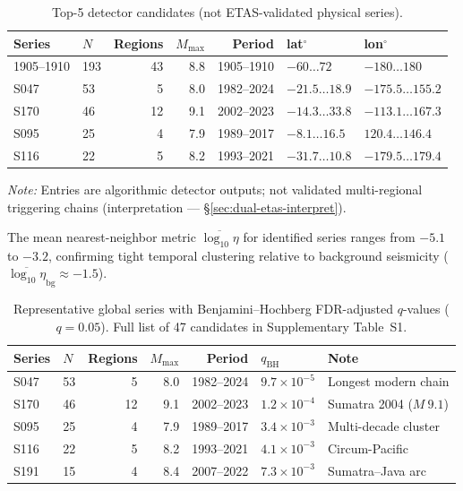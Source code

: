 \documentclass[draft]{agujournal2019}
\begin{document}
\begin{table}[htbp]
\centering
\caption{Top-5 detector candidates (not ETAS-validated physical series).}
\label{tab:top5}
\begin{tabular}{llrrrll}
\hline
Series & $N$ & Regions & $M_\mathrm{max}$ & Period & lat$^\circ$ & lon$^\circ$ \\
\hline
1905--1910 & 193 & 43 & 8.8 & 1905--1910 & $-60\ldots72$ & $-180\ldots180$ \\
S047       &  53 &  5 & 8.0 & 1982--2024 & $-21.5\ldots18.9$ & $-175.5\ldots155.2$ \\
S170       &  46 & 12 & 9.1 & 2002--2023 & $-14.3\ldots33.8$ & $-113.1\ldots167.3$ \\
S095       &  25 &  4 & 7.9 & 1989--2017 & $-8.1\ldots16.5$ & $120.4\ldots146.4$ \\
S116       &  22 &  5 & 8.2 & 1993--2021 & $-31.7\ldots10.8$ & $-179.5\ldots179.4$ \\
\hline
\end{tabular}
\end{table}
\noindent\footnotesize\textit{Note:} Entries are algorithmic detector outputs;
not validated multi-regional triggering chains (interpretation --- \S\ref{sec:dual-etas-interpret}).

The mean nearest-neighbor metric $\overline{\log_{10}\eta}$ for identified
series ranges from $-5.1$ to $-3.2$, confirming tight temporal clustering
relative to background seismicity ($\overline{\log_{10}\eta}_\mathrm{bg} \approx -1.5$).

\begin{table}[htbp]
\centering
\caption{Representative global series with Benjamini--Hochberg FDR-adjusted
$q$-values ($q = 0.05$).  Full list of 47 candidates in Supplementary
Table~S1.}
\label{tab:fdr_series}
\begin{tabular}{llrrrll}
\hline
Series & $N$ & Regions & $M_\mathrm{max}$ & Period & $q_\mathrm{BH}$ & Note \\
\hline
S047 & 53 &  5 & 8.0 & 1982--2024 & $9.7 \times 10^{-5}$ & Longest modern chain \\
S170 & 46 & 12 & 9.1 & 2002--2023 & $1.2 \times 10^{-4}$ & Sumatra 2004 ($M~9.1$) \\
S095 & 25 &  4 & 7.9 & 1989--2017 & $3.4 \times 10^{-3}$ & Multi-decade cluster \\
S116 & 22 &  5 & 8.2 & 1993--2021 & $4.1 \times 10^{-3}$ & Circum-Pacific \\
S191 & 15 &  4 & 8.4 & 2007--2022 & $7.3 \times 10^{-3}$ & Sumatra--Java arc \\
\hline
\end{tabular}
\end{table}
\end{document}
